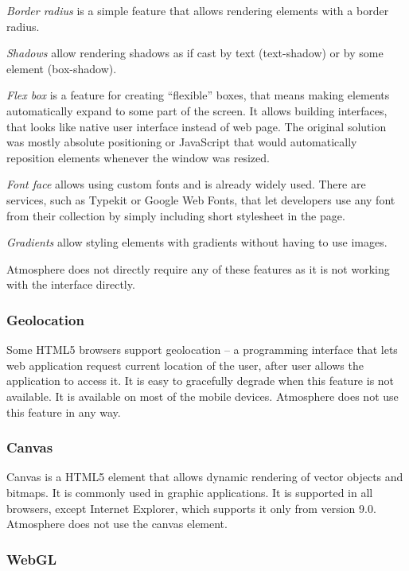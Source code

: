 \emph{Border radius} is a simple feature that allows rendering elements with a border radius. 

\emph{Shadows} allow rendering shadows as if cast by text (text-shadow) or by some element (box-shadow).

\emph{Flex box} is a feature for creating ``flexible'' boxes, that means making elements automatically expand to some part of the screen. It allows building interfaces, that looks like native user interface instead of web page. The original solution was mostly absolute positioning or JavaScript that would automatically reposition elements whenever the window was resized. 

\emph{Font face} allows using custom fonts and is already widely used. There are services, such as Typekit \citep{typekit} or Google Web Fonts, \citep{google_webfonts} that let developers use any font from their collection by simply including short stylesheet in the page. 

\emph{Gradients} allow styling elements with gradients without having to use images.

Atmosphere does not directly require any of these features as it is not working with the interface directly.  

\subsubsection{Geolocation}

Some HTML5 browsers support geolocation – a programming interface that lets web application request current location of the user, after user allows the application to access it. It is easy to gracefully degrade when this feature is not available. It is available on most of the mobile devices. Atmosphere does not use this feature in any way.

\subsubsection{Canvas}

Canvas is a HTML5 element that allows dynamic rendering of vector objects and bitmaps. It is commonly used in graphic applications. It is supported in all browsers, except Internet Explorer, which supports it only from version 9.0. Atmosphere does not use the canvas element.

\subsubsection{WebGL}

